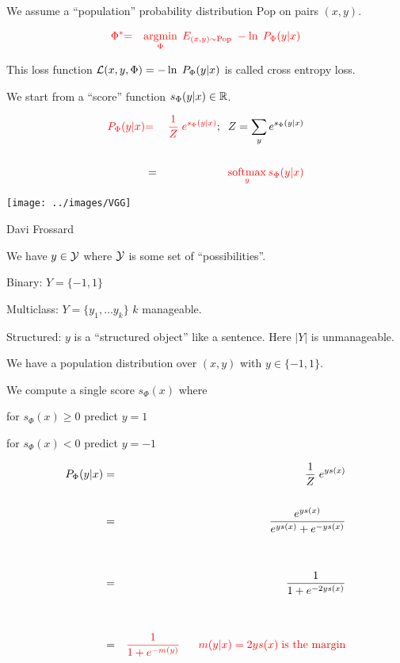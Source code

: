 {We assume a ``population'' probability distribution $\mathrm{Pop}$ on pairs $(x,y)$.

\vfill
\begin{eqnarray*}
{\color{red} \Phi^*} & {\color{red}  =} & {\color{red} \operatorname*{argmin}_\Phi \;E_{(x,y) \sim \mathrm{Pop}}\; -\ln \;P_\Phi(y|x)}
\end{eqnarray*}

\vfill
This loss function {\color{red} ${\cal L}(x,y,\Phi) = - \ln \;P_\Phi(y|x)$} is called {\color{red} cross entropy loss}.


We start from a ``score'' function $s_\Phi(y|x) \in \mathbb{R}$.

\vfill
\begin{eqnarray*}
  {\color{red} P_\Phi(y|x)} & {\color{red} =} & {\color{red} \frac{1}{Z}\;e^{s_\Phi(y|x)}};\;\; Z = \sum_y e^{s_\Phi(y|x)} \\
  \\
  & = & {\color{red} \operatorname*{softmax}_y s_\Phi(y|x)}
\end{eqnarray*}


\centerline{\texttt{[image: ../images/VGG]}}
\centerline{\large Davi Frossard}


We have {\color{red} $y \in {\cal Y}$} where {\color{red} ${\cal Y}$} is some set of ``possibilities''.

\vfill
Binary: {\color{red} $Y = \{-1,1\}$}

\vfill
Multiclass: {\color{red} $Y = \{y_1,\ldots y_k\}$} $k$ manageable.

\vfill
Structured: {\color{red} $y$} is a ``structured object'' like a sentence.  Here {\color{red} $|Y|$} is unmanageable.


We have a population distribution over $(x,y)$ with $y \in \{-1,1\}$.

\vfill
We compute a single score $s_\Phi(x)$ where

\vfill
for $s_\Phi(x) \geq 0$ predict $y = 1$

\vfill
for $s_\Phi(x) < 0$ predict $y = -1$


\begin{eqnarray*}
  P_\Phi(y|x) & = & \frac{1}{Z} \;e^{ys(x)} \\
  \\
  & = & \frac{e^{ys(x)}}{e^{ys(x)} + e^{-ys(x)}} \\
  \\
  \\
  & = & \frac{1}{1 + e^{-2ys(x)}} \\
  \\
  \\
    & = & {\color{red} \frac{1}{1 + e^{-m(y)}} \;\;\;\;\;\;m(y|x) = 2ys(x)\;\mbox{is the margin}}
\end{eqnarray*}

}

